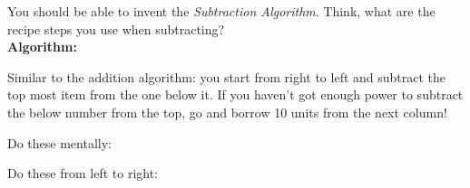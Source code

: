 \begin{minipage}{\textwidth}
    You should be able to invent the \emph{Subtraction Algorithm}. Think, what are the recipe steps you use when subtracting?\\
    {\large\textbf{Algorithm:}}
    \begin{solutionorbox}[2in]
        Similar to the addition algorithm: you start from right to left and subtract the top most item from the one below it. If you haven't got enough power to subtract the below number from the top, go and borrow 10 units from the next column!
    \end{solutionorbox}
\end{minipage}

\begin{exercises}
    \begin{questions}
        \Question[8] Do these mentally:
        \begin{multicols}{2}
        \end{multicols}
        \Question[6] Do these from left to right:
        \begin{multicols}{2}
            \begin{parts}

\end{parts}
\end{multicols}
\end{questions}
\end{exercises}
